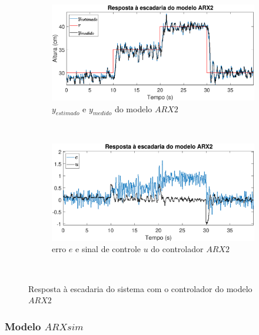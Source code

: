\begin{figure}[htb]
	\centering
	\begin{subfigure}[t]{0.48\textwidth}
		\includegraphics[width=1\linewidth]{stairrarx2y}
		\caption[$y_{estimado}$ e $y_{medido}$ do modelo $ARX2$]{$y_{estimado}$ e $y_{medido}$ do modelo $ARX2$}
		\label{fig:stairrarx2y}
	\end{subfigure}
	~ %
	\begin{subfigure}[t]{0.48\textwidth}
		\includegraphics[width=1\linewidth]{stairrarx2e}
		\caption[erro $e$ e sinal de controle $u$ do controlador $ARX2$]{erro $e$ e sinal de controle $u$ do controlador $ARX2$}
		\label{fig:stairrarx2e}
	\end{subfigure}
	~ %
	
	\caption{Resposta à escadaria do sistema com o controlador do modelo $ARX2$}\label{fig:stairrarx2}
\end{figure}

\subsubsection{Modelo $ARXsim$}

